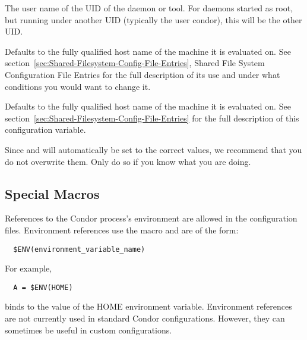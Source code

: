 \begin{description}
\label{param:Username}
\item[\MacroU{USERNAME}]
  The user name of the UID of the daemon or tool.
  For daemons started as root, but running under another UID
  (typically the user condor), this will be the other UID.

\label{param:FilesystemDomain}
\item[\MacroU{FILESYSTEM\_DOMAIN}]
  Defaults to the fully
  qualified host name of the machine it is evaluated on.  See
  section~\ref{sec:Shared-Filesystem-Config-File-Entries}, Shared
  File System Configuration File Entries for the full description of
  its use and under what conditions you would want to change it.

\label{param:UIDDomain}
\item[\MacroU{UID\_DOMAIN}]
  Defaults to the fully
  qualified host name of the machine it is evaluated on.  See
  section~\ref{sec:Shared-Filesystem-Config-File-Entries} 
  for the full description of this configuration variable.

\end{description}

Since  and  will automatically be set to the
correct values, we recommend that you do not overwrite them.
Only do so if you know what you are doing.



\subsection{\label{sec:Config-File-Special}Special Macros}

References to the Condor process's environment are allowed in the
configuration files.
Environment references use the  macro and are of the form:
\begin{verbatim}
  $ENV(environment_variable_name)
\end{verbatim}
For example, 
\begin{verbatim}
  A = $ENV(HOME)
\end{verbatim}
binds  to the value of the HOME environment variable.
Environment references are not currently used in standard Condor
configurations.
However, they can sometimes be useful in custom configurations.

